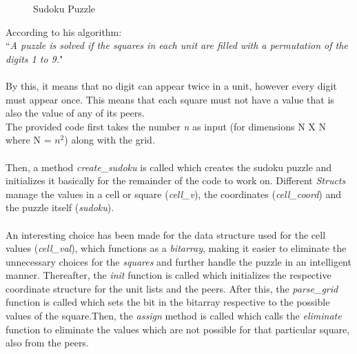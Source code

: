 \documentclass[a4paper,10pt,twoside]{article}
\begin{document}
\begin{figure}[h]
	\centering
	\caption{Sudoku Puzzle}
	\label{fig:ualloc}
\end{figure}
According to his algorithm:\\
``\textit{A puzzle is solved if the squares in each unit are filled with a permutation of the digits 1 to 9.}"\\ \\
By this, it means that no digit can appear twice in a unit, however every digit must appear once. This means that each square must not have a value that is also the value of any of its peers.\\
The provided code first takes the number \textit{n} as input (for dimensions N X N where N = $n^{2}$) along with the grid.\\ \\
Then, a method \textit{create\_sudoku} is called which creates the sudoku puzzle and initializes it basically for the remainder of the code to work on. Different \textit{Structs} manage the values in a cell or square (\textit{cell\_v}), the coordinates (\textit{cell\_coord}) and the puzzle itself (\textit{sudoku}).\\ \\
An interesting choice has been made for the data structure used for the cell values (\textit{cell\_val}), which functions as a \textit{bitarray}, making it easier to eliminate the unnecessary choices for the \textit{squares} and further handle the puzzle in an intelligent manner. Thereafter, the \textit{init} function is called which initializes the respective coordinate structure for the unit lists and the peers. After this, the \textit{parse\_grid} function is called which sets the bit in the bitarray respective to the possible values of the square.Then, the \textit{assign} method is called which calls the \textit{eliminate} function to eliminate the values which are not possible for that particular square, also from the peers.\\ \\
\end{document}
